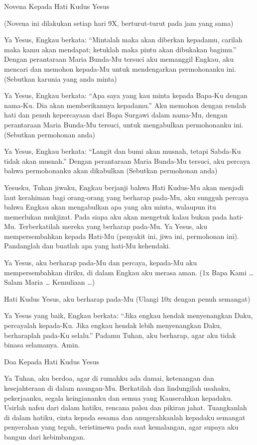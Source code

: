 \documentclass[a5paper,headsepline,titlepage,11pt,nnormalheadings,DIVcalc]{scrbook}
\begin{document}
Novena Kepada Hati Kudus Yesus

(Novena ini dilakukan setiap hari 9X,
berturut-turut pada jam yang sama)

Ya Yesus, Engkau berkata:
“Mintalah maka akan diberkan kepadamu,
carilah maka kamu akan mendapat;
ketuklah maka pintu akan dibukakan bagimu.”
Dengan perantaraan Maria Bunda-Mu
tersuci aku memanggil Engkau,
aku mencari dan memohon kepada-Mu
untuk mendengarkan permohonanku ini.
(Sebutkan karunia yang anda minta)

Ya Yesus, Engkau berkata:
“Apa saya yang kau minta kepada Bapa-Ku dengan
nama-Ku. Dia akan memberikannya kepadamu.”
Aku memohon dengan rendah hati dan penuh
kepercayaan dari Bapa Surgawi dalam nama-Mu,
dengan perantaraan Maria Bunda-Mu tersuci,
untuk mengabulkan permohonanku ini.
(Sebutkan permohonan anda)

Ya Yesus, Engkau berkata:
“Langit dan bumi akan musnah,
tetapi Sabda-Ku tidak akan musnah.”
Dengan perantaraan Maria Bunda-Mu tersuci,
aku percaya bahwa permohonanku akan dikabulkan
(Sebutkan permohonan anda)

Yesusku, Tuhan jiwaku, Engkau berjanji bahwa
Hati Kudus-Mu akan menjadi laut kerahiman
bagi orang-orang yang berharap pada-Mu,
aku sungguh percaya bahwa Engkau
akan mengabulkan apa yang aku minta,
walaupun itu memerlukan mukjizat.
Pada siapa aku akan mengetuk
kalau bukan pada hati-Mu.
Terberkatilah mereka yang berharap pada-Mu.
Ya Yesus, aku mempersembahkan kepada Hati-Mu
(penyakit ini, jiwa ini, permohonan ini).
Pandanglah dan buatlah apa yang hati-Mu kehendaki.

Ya Yesus, aku berharap pada-Mu dan percaya,
kepada-Mu aku mempersembahkan diriku,
di dalam Engkau aku merasa aman.
(1x Bapa Kami … Salam Maria … Kemuliaan …)

Hati Kudus Yesus, aku berharap pada-Mu
(Ulangi 10x dengan penuh semangat)

Ya Yesus yang baik, Engkau berkata:
“Jika engkau hendak menyenangkan Daku,
percayalah kepada-Ku.
Jika engkau hendak lebih menyenangkan Daku,
berharaplah pada-Ku selalu.”
Padamu Tuhan, aku berharap,
agar aku tidak binasa selamanya.
Amin.

Doa Kepada Hati Kudus Yesus

Ya Tuhan, aku berdoa, agar di rumahku ada damai, ketenangan dan kesejahteraan di dalam naungan-Mu. Berkatilah dan lindungilah usahaku, pekerjaanku, segala keingiananku dan semua yang Kauserahkan kepadaku. Usirlah nafsu dari dalam hatiku, rencana palsu dan pikiran jahat. Tuangkanlah di dalam hatiku, cinta kepada sesama dan anugerahkanlah kepadaku semangat penyerahan yang teguh, teristimewa pada saat kemalangan, agar supaya aku bangun dari kebimbangan.
\end{document}
